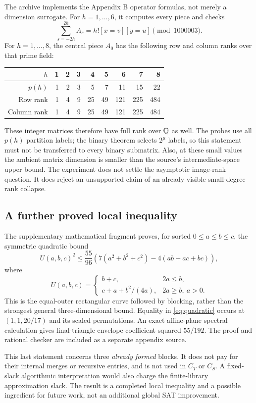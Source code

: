 The archive implements the Appendix B operator formulas, not merely a
dimension surrogate. For $h=1,\ldots,6$, it computes every piece and checks
\[
 \sum_{s=-2h}^{2h}A_s=h![x=v][y=u]
 \pmod{1000003}.
\]
For $h=1,\ldots,8$, the central piece $A_0$ has the following row and
column ranks over that prime field:
\begin{center}
\begin{tabular}{@{}rrrrrrrrr@{}}
\toprule $h$&1&2&3&4&5&6&7&8\\
\midrule $p(h)$&1&2&3&5&7&11&15&22\\
Row rank&1&4&9&25&49&121&225&484\\
Column rank&1&4&9&25&49&121&225&484\\
\bottomrule
\end{tabular}
\end{center}
These integer matrices therefore have full rank over $\mathbb Q$ as well.
The probes use all $p(h)$ partition labels; the binary theorem selects
$2^\mu$ labels, so this statement must not be transferred to every binary
submatrix. Also, at these small values the ambient matrix dimension is
smaller than the source's intermediate-space upper bound. The experiment
does not settle the asymptotic image-rank question. It does reject an
unsupported claim of an already visible small-degree rank collapse.

\subsection{A further proved local inequality}

The supplementary mathematical fragment proves, for sorted
$0\le a\le b\le c$, the symmetric quadratic bound
\begin{equation}\label{eq:quadratic}
 U(a,b,c)^2\le\frac{55}{96}
 \left(7(a^2+b^2+c^2)-4(ab+ac+bc)\right),
\end{equation}
where
\[
 U(a,b,c)=
 \begin{cases}
 b+c,&2a\le b,\\
 c+a+b^2/(4a),&2a\ge b,\ a>0.
 \end{cases}
\]
This is the equal-outer rectangular curve followed by blocking, rather
than the strongest general three-dimensional bound. Equality in
\eqref{eq:quadratic} occurs at $(1,1,20/17)$ and its scaled permutations.
An exact affine-plane spectral calculation gives final-triangle envelope
coefficient squared $55/192$. The proof and rational checker are included
as a separate appendix source.

This last statement concerns three \emph{already formed} blocks. It does
not pay for their internal merges or recursive entries, and is not used
in $C_T$ or $C_S$. A fixed-slack algorithmic interpretation would also
charge the finite-library approximation slack. The result is a completed
local inequality and a possible ingredient for future work, not an
additional global SAT improvement.
